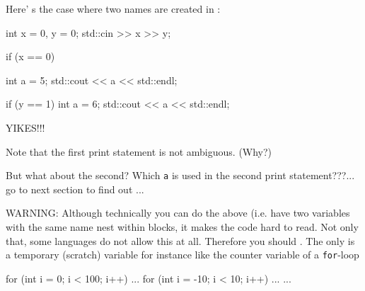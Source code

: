 Here' s the case where two names are created in :
\sidenote
{
}
\begin{console}
int x = 0, y = 0;
std::cin >> x >> y;

if (x == 0)
{    
     int a = 5;
     std::cout << a << std::endl;

     if (y == 1)
     {
          int a = 6;
          std::cout << a << std::endl;
     }
}
\end{console}

YIKES!!!

Note that the first print statement is not ambiguous. (Why?)

But what about the second? Which \texttt{a} is used in the second print statement???... go to next section to find out ...

WARNING: Although technically you can do the above (i.e. have two variables with the same name nest within blocks, it makes the code hard to read. Not only that, some languages do not allow this at all. Therefore you should . The only  is a temporary (scratch) variable for instance like the counter variable of a \texttt{for}-loop

\begin{console}
for (int i = 0; i < 100; i++)
{    
     ...
     for (int i = -10; i < 10; i++)
     {    
          ...
     }
     ...
}
\end{console}

